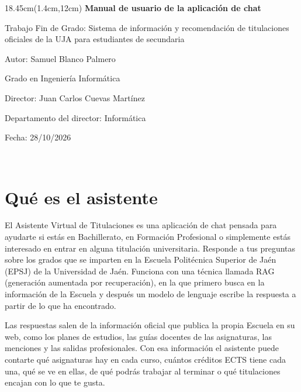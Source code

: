 \documentclass[12pt, a4paper]{article}
\begin{document}
\thispagestyle{empty}
\begin{textblock*}{18.45cm}(1.4cm,12cm)
  \centering
  {\fontsize{30}{40}\selectfont \textbf{\color{naranja}Manual de usuario de la aplicación de chat}}
  \vspace{.4cm}

  {\fontsize{12}{16}\selectfont Trabajo Fin de Grado: Sistema de información y recomendación de titulaciones oficiales de la UJA para estudiantes de secundaria}
  \vspace{.2cm}

  {\fontsize{16}{21}\selectfont Autor: Samuel Blanco Palmero}

  {\fontsize{16}{21}\selectfont Grado en Ingeniería Informática}

  {\fontsize{12}{10}\selectfont Director: Juan Carlos Cuevas Martínez}
  \vspace{-.4cm}

  {\fontsize{12}{10}\selectfont Departamento del director: Informática}

  \vspace{0.3cm}
  {\fontsize{16}{21}\selectfont Fecha: 28/10/2026}
\end{textblock*}
~
\clearpage
\ClearWallPaper

\onehalfspacing
\tableofcontents
\clearpage

\section[Qué es el asistente]{Qué es el asistente}



El Asistente Virtual de Titulaciones es una aplicación de chat pensada para ayudarte si estás en Bachillerato, en Formación Profesional o simplemente estás interesado en entrar en alguna titulación universitaria. Responde a tus preguntas sobre los grados que se imparten en la Escuela Politécnica Superior de Jaén (EPSJ) de la Universidad de Jaén. Funciona con una técnica llamada RAG (generación aumentada por recuperación), en la que primero busca en la información de la Escuela y después un modelo de lenguaje escribe la respuesta a partir de lo que ha encontrado.

Las respuestas salen de la información oficial que publica la propia Escuela en su web, como los planes de estudios, las guías docentes de las asignaturas, las menciones y las salidas profesionales. Con esa información el asistente puede contarte qué asignaturas hay en cada curso, cuántos créditos ECTS tiene cada una, qué se ve en ellas, de qué podrás trabajar al terminar o qué titulaciones encajan con lo que te gusta.
\end{document}
